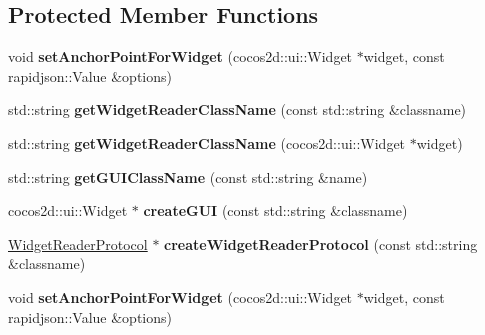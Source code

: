 \subsection*{Protected Member Functions}
\begin{DoxyCompactItemize}
\item 
\mbox{\label{classcocostudio_1_1WidgetPropertiesReader_a5456768bc6e8a10ce47f6bcb46cc7f77}} 
void {\bfseries set\+Anchor\+Point\+For\+Widget} (cocos2d\+::ui\+::\+Widget $\ast$widget, const rapidjson\+::\+Value \&options)
\item 
\mbox{\label{classcocostudio_1_1WidgetPropertiesReader_a50f1c8dd76fb357af18e37482ee792f3}} 
std\+::string {\bfseries get\+Widget\+Reader\+Class\+Name} (const std\+::string \&classname)
\item 
\mbox{\label{classcocostudio_1_1WidgetPropertiesReader_a01e166acb32f94ea81628e9de1c57a23}} 
std\+::string {\bfseries get\+Widget\+Reader\+Class\+Name} (cocos2d\+::ui\+::\+Widget $\ast$widget)
\item 
\mbox{\label{classcocostudio_1_1WidgetPropertiesReader_ad6b6b1af7c7783970cdd25a7f49f9a54}} 
std\+::string {\bfseries get\+G\+U\+I\+Class\+Name} (const std\+::string \&name)
\item 
\mbox{\label{classcocostudio_1_1WidgetPropertiesReader_a42af439c5a72a9e44887a4a53104f7a0}} 
cocos2d\+::ui\+::\+Widget $\ast$ {\bfseries create\+G\+UI} (const std\+::string \&classname)
\item 
\mbox{\label{classcocostudio_1_1WidgetPropertiesReader_ac7f386db9a89db93a9c991ffc08d8951}} 
\hyperlink{classcocostudio_1_1WidgetReaderProtocol}{Widget\+Reader\+Protocol} $\ast$ {\bfseries create\+Widget\+Reader\+Protocol} (const std\+::string \&classname)
\item 
\mbox{\label{classcocostudio_1_1WidgetPropertiesReader_a5456768bc6e8a10ce47f6bcb46cc7f77}} 
void {\bfseries set\+Anchor\+Point\+For\+Widget} (cocos2d\+::ui\+::\+Widget $\ast$widget, const rapidjson\+::\+Value \&options)

\end{DoxyCompactItemize}

